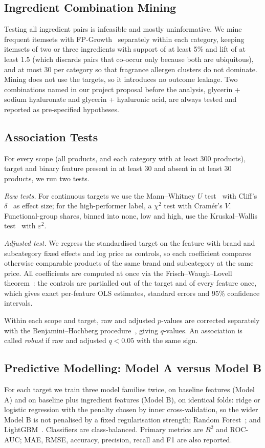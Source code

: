 \documentclass[11pt,a4paper]{article}
\begin{document}
\subsection{Ingredient Combination Mining}
\label{sec:combos}
Testing all ingredient pairs is infeasible and mostly uninformative. We mine frequent itemsets with FP-Growth~\cite{han2000fpgrowth} separately within each category, keeping itemsets of two or three ingredients with support of at least 5\% and lift of at least 1.5 (which discards pairs that co-occur only because both are ubiquitous), and at most 30 per category so that fragrance allergen clusters do not dominate. Mining does not use the targets, so it introduces no outcome leakage. Two combinations named in our project proposal before the analysis, glycerin + sodium hyaluronate and glycerin + hyaluronic acid, are always tested and reported as pre-specified hypotheses.

\subsection{Association Tests}
For every scope (all products, and each category with at least 300 products), target and binary feature present in at least 30 and absent in at least 30 products, we run two tests.

\emph{Raw tests.} For continuous targets we use the Mann--Whitney $U$ test~\cite{mann1947} with Cliff's $\delta$~\cite{cliff1993} as effect size; for the high-performer label, a $\chi^2$ test with Cram\'er's $V$. Functional-group shares, binned into none, low and high, use the Kruskal--Wallis test~\cite{kruskal1952} with $\varepsilon^2$.

\emph{Adjusted test.} We regress the standardised target on the feature with brand and subcategory fixed effects and log price as controls, so each coefficient compares otherwise comparable products of the same brand and subcategory at the same price. All coefficients are computed at once via the Frisch--Waugh--Lovell theorem~\cite{frisch1933,lovell1963}: the controls are partialled out of the target and of every feature once, which gives exact per-feature OLS estimates, standard errors and 95\% confidence intervals.

Within each scope and target, raw and adjusted $p$-values are corrected separately with the Benjamini--Hochberg procedure~\cite{benjamini1995}, giving $q$-values. An association is called \emph{robust} if raw and adjusted $q<0.05$ with the same sign.

\subsection{Predictive Modelling: Model A versus Model B}
For each target we train three model families twice, on baseline features (Model A) and on baseline plus ingredient features (Model B), on identical folds: ridge or logistic regression with the penalty chosen by inner cross-validation, so the wider Model B is not penalised by a fixed regularisation strength; Random Forest~\cite{breiman2001rf}; and LightGBM~\cite{ke2017lightgbm}. Classifiers are class-balanced. Primary metrics are $R^2$ and ROC-AUC; MAE, RMSE, accuracy, precision, recall and F1 are also reported.
\end{document}
